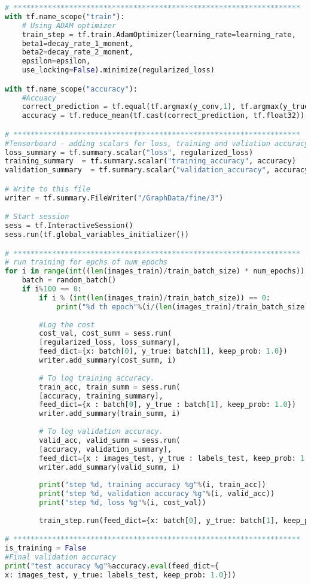 \begin{lstlisting}[language=Python, label=lst:neuralnet.py, caption={neural\_net.py}, basicstyle=\tiny]
# *******************************************************************
with tf.name_scope("train"):
	# Using ADAM optimizer
	train_step = tf.train.AdamOptimizer(learning_rate=learning_rate, 
	beta1=decay_rate_1_moment, 
	beta2=decay_rate_2_moment, 
	epsilon=epsilon, 
	use_locking=False).minimize(regularized_loss)

with tf.name_scope("accuracy"):
	#Accuacy
	correct_prediction = tf.equal(tf.argmax(y_conv,1), tf.argmax(y_true,1))
	accuracy = tf.reduce_mean(tf.cast(correct_prediction, tf.float32))

# *******************************************************************
#Tensorboard - adding scalars for loss, training and valiation accuracy.
loss_summary = tf.summary.scalar("loss", regularized_loss)
training_summary  = tf.summary.scalar("training_accuracy", accuracy)
validation_summary  = tf.summary.scalar("validation_accuracy", accuracy)

# Write to this file
writer = tf.summary.FileWriter("/GraphData/fine/3")

# Start session
sess = tf.InteractiveSession()
sess.run(tf.global_variables_initializer())

# *******************************************************************
# run training for epchs of num_epochs
for i in range(int((len(images_train)/train_batch_size) * num_epochs)):
	batch = random_batch()
	if i%100 == 0:
		if i % (int(len(images_train)/train_batch_size)) == 0:   
			print("%d th epoch"%(i/(len(images_train)/train_batch_size)))
		
		#Log the cost
		cost_val, cost_summ = sess.run(
		[regularized_loss, loss_summary],
		feed_dict={x: batch[0], y_true: batch[1], keep_prob: 1.0})
		writer.add_summary(cost_summ, i)
		
		# To log training accuracy.
		train_acc, train_summ = sess.run(
		[accuracy, training_summary],
		feed_dict={x : batch[0], y_true : batch[1], keep_prob: 1.0})
		writer.add_summary(train_summ, i)
		
		# To log validation accuracy.
		valid_acc, valid_summ = sess.run(
		[accuracy, validation_summary],
		feed_dict={x : images_test, y_true : labels_test, keep_prob: 1.0})
		writer.add_summary(valid_summ, i)
		
		print("step %d, training accuracy %g"%(i, train_acc))
		print("step %d, validation accuracy %g"%(i, valid_acc))
		print("step %d, loss %g"%(i, cost_val))
		
		train_step.run(feed_dict={x: batch[0], y_true: batch[1], keep_prob: drop_out})

# *******************************************************************
is_training = False
#Final validation accuracy
print("test accuracy %g"%accuracy.eval(feed_dict={
x: images_test, y_true: labels_test, keep_prob: 1.0}))


\end{lstlisting}